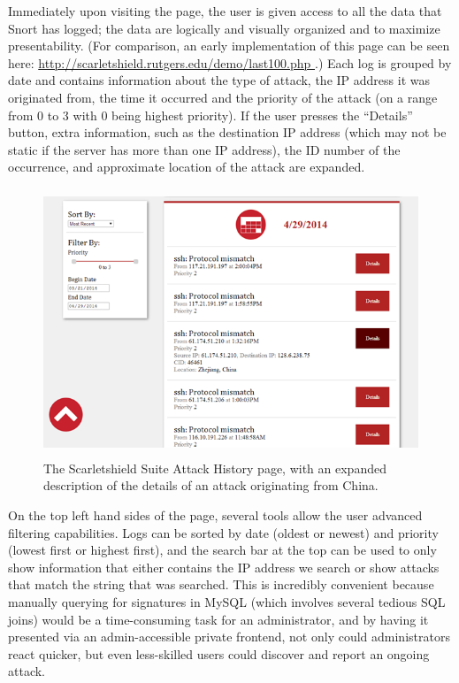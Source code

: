 \documentclass[12pt,letterpaper,titlepage]{report}
\begin{document}
{Immediately upon visiting the page, the user is given access to all the data
that Snort has logged; the data are logically and visually organized and to
maximize presentability. (For comparison, an early implementation of this
page can be seen here: \url{http://scarletshield.rutgers.edu/demo/last100.php }.) 
Each log is grouped by date and contains information
about the type of attack, the IP address it was originated from, the time it
occurred and the priority of the attack (on a range from 0 to 3 with 0 being
highest priority). If the user presses the ``Details'' button, extra information,
such as the destination IP address (which may not be static if the server has
more than one IP address), the ID number of the occurrence, and approximate
location of the attack are expanded.


\begin{figure}[t!]
\centering
  \includegraphics[height=8cm]{./historydet.png}
  \caption{The Scarletshield Suite Attack History page, with an expanded
  description of the details of an attack originating from China.}
\end{figure}

On the top left hand sides of the page, several tools allow the user advanced
filtering capabilities. Logs can be sorted by date (oldest or newest) and
priority (lowest first or highest first), and the search bar at the top can be
used to only show information that either contains the IP address we search or
show attacks that match the string that was searched. This is incredibly
convenient because manually querying for signatures in MySQL (which involves
several tedious SQL joins) would be a time-consuming task for an administrator,
and by having it presented via an admin-accessible private frontend, not only
could administrators react quicker, but even less-skilled users could discover
and report an ongoing attack.

}
\end{document}
